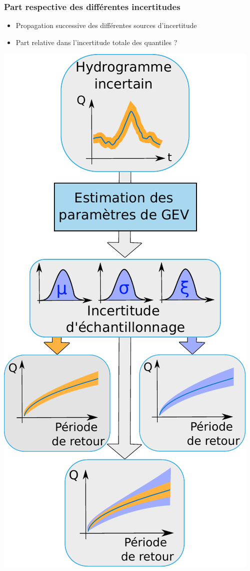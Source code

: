 \documentclass[compress,9pt]{beamer}
\begin{document}
	
	\begin{frame}
		\frametitle{Part respective des différentes incertitudes}
		\begin{minipage}{0.45\textwidth}
			\begin{itemize}
			\vfill
				\item Propagation successive des différentes sources d'incertitude\\
			\vspace{15pt}				
				\item Part relative dans l'incertitude totale des quantiles ? \\
			\vfill
			\end{itemize}
		
		\end{minipage}
		\hfill		
		\begin{minipage}{0.53\textwidth}
			\centering
			\vfill
			\includegraphics[width = .55\textwidth]{./Figures/uPropag.pdf}
		\end{minipage}
	\end{frame}
	
	
\end{document}
